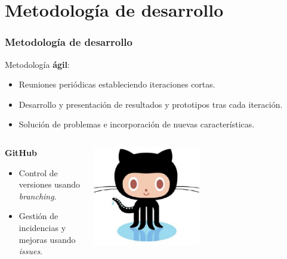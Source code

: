 \documentclass{beamer}
\begin{document}

\section{Metodología de desarrollo}
\begin{frame}[allowframebreaks]
  \frametitle{Metodología de desarrollo}
  
  Metodología {\bfseries ágil}:
  \bigskip
  
  \begin{itemize}
    \item Reuniones periódicas estableciendo iteraciones cortas.
    \item Desarrollo y presentación de resultados y prototipos tras cada iteración.
    \item Solución de problemas e incorporación de nuevas características. 
  \end{itemize}
  \framebreak
    
  
  \begin{columns}
    \begin{column}{5cm}
    	{\bfseries GitHub}
    	\bigskip
      \begin{itemize}
        \item Control de versiones usando \textit{branching}.
        \item Gestión de incidencias y mejoras usando \textit{issues}.
      \end{itemize}
    \end{column}
    \begin{column}{5cm}
    	\includegraphics[width=0.5\textwidth]{images/octocat.eps}
    \end{column}
  \end{columns}
  \bigskip
  \bigskip  
  

\end{frame}
\end{document}

